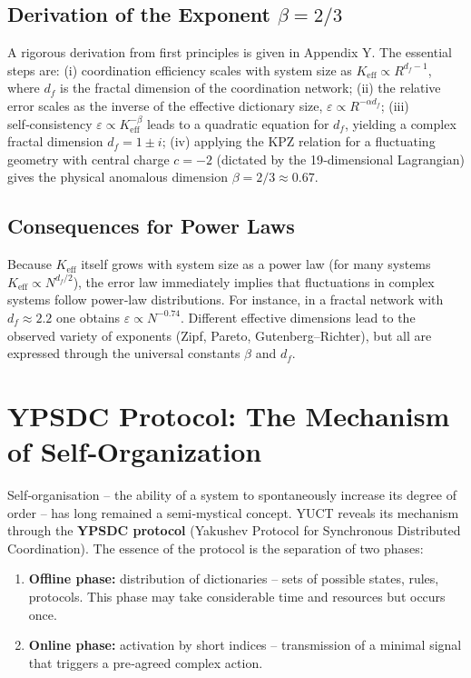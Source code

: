 \documentclass[11pt]{article}
\theoremstyle{remark}
\newcommand{\Keff}{K_{\mathrm{eff}}}
\begin{document}
	\subsection{Derivation of the Exponent \(\beta = 2/3\)}
	
	A rigorous derivation from first principles is given in Appendix Y. The essential steps are: (i) coordination efficiency scales with system size as \(\Keff \propto R^{d_f-1}\), where \(d_f\) is the fractal dimension of the coordination network; (ii) the relative error scales as the inverse of the effective dictionary size, \(\varepsilon \propto R^{-\alpha d_f}\); (iii) self‑consistency \(\varepsilon \propto \Keff^{-\beta}\) leads to a quadratic equation for \(d_f\), yielding a complex fractal dimension \(d_f = 1 \pm i\); (iv) applying the KPZ relation for a fluctuating geometry with central charge \(c=-2\) (dictated by the 19‑dimensional Lagrangian) gives the physical anomalous dimension \(\beta = 2/3 \approx 0.67\).
	
	\subsection{Consequences for Power Laws}
	
	Because \(\Keff\) itself grows with system size as a power law (for many systems \(\Keff \propto N^{d_f/2}\)), the error law immediately implies that fluctuations in complex systems follow power‑law distributions. For instance, in a fractal network with \(d_f \approx 2.2\) one obtains \(\varepsilon \propto N^{-0.74}\). Different effective dimensions lead to the observed variety of exponents (Zipf, Pareto, Gutenberg–Richter), but all are expressed through the universal constants \(\beta\) and \(d_f\).
	
	\section{YPSDC Protocol: The Mechanism of Self‑Organization}
	\label{sec:ypsdc}
	
	Self‑organisation – the ability of a system to spontaneously increase its degree of order – has long remained a semi‑mystical concept. YUCT reveals its mechanism through the \textbf{YPSDC protocol} (Yakushev Protocol for Synchronous Distributed Coordination). The essence of the protocol is the separation of two phases:
	\begin{enumerate}
		\item \textbf{Offline phase:} distribution of dictionaries – sets of possible states, rules, protocols. This phase may take considerable time and resources but occurs once.
		\item \textbf{Online phase:} activation by short indices – transmission of a minimal signal that triggers a pre‑agreed complex action.
	\end{enumerate}
	
\end{document}
